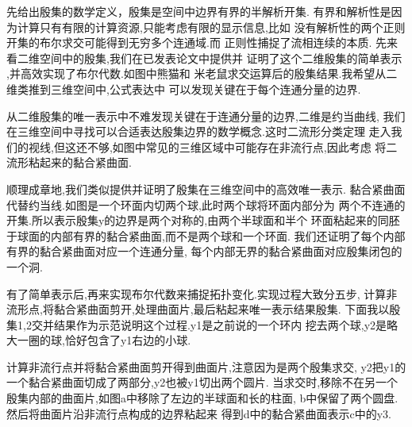 \documentclass[UTF8]{ctexbeamer}	%
\theoremstyle{plain}
\theoremstyle{definition}
\theoremstyle{remark}
\numberwithin{equation}{section}
\begin{document}
\begin{frame}
  先给出殷集的数学定义，殷集是空间中边界有界的半解析开集.
  有界和解析性是因为计算只有有限的计算资源,只能考虑有限的显示信息,比如
  没有解析性的两个正则开集的布尔求交可能得到无穷多个连通域.而
  正则性捕捉了流相连续的本质.
  先来看二维空间中的殷集,我们在已发表论文中提供并
  证明了这个二维殷集的简单表示
  ,并高效实现了布尔代数.如图中熊猫和
  米老鼠求交运算后的殷集结果.我希望从二维类推到三维空间中,公式表达中
  可以发现关键在于每个连通分量的边界.
\end{frame}

\begin{frame}
  从二维殷集的唯一表示中不难发现关键在于连通分量的边界,二维是约当曲线,
  我们在三维空间中寻找可以合适表达殷集边界的数学概念.这时二流形分类定理
  走入我们的视线,但这还不够,如图中常见的三维区域中可能存在非流行点,因此考虑
  将二流形粘起来的黏合紧曲面.
\end{frame}

\begin{frame}
  顺理成章地,我们类似提供并证明了殷集在三维空间中的高效唯一表示.
  黏合紧曲面代替约当线.如图是一个环面内切两个球,此时两个球将环面内部分为
  两个不连通的开集.所以表示殷集y的边界是两个对称的,由两个半球面和半个
  环面粘起来的同胚于球面的内部有界的黏合紧曲面,而不是两个球和一个环面.
  我们还证明了每个内部有界的黏合紧曲面对应一个连通分量,
  每个内部无界的黏合紧曲面对应殷集闭包的一个洞.
\end{frame}

\begin{frame}
  有了简单表示后,再来实现布尔代数来捕捉拓扑变化.实现过程大致分五步,
  计算非流形点,将黏合紧曲面剪开,处理曲面片,最后粘起来唯一表示结果殷集.
  下面我以殷集1,2交并结果作为示范说明这个过程.y1是之前说的一个环内
  挖去两个球,y2是略大一圈的球,恰好包含了y1右边的小球.
\end{frame}

\begin{frame}
  计算非流行点并将黏合紧曲面剪开得到曲面片,注意因为是两个殷集求交,
  y2把y1的一个黏合紧曲面切成了两部分,y2也被y1切出两个圆片.
  当求交时,移除不在另一个殷集内部的曲面片,如图a中移除了左边的半球面和长的柱面,
  b中保留了两个圆盘.然后将曲面片沿非流行点构成的边界粘起来
  得到d中的黏合紧曲面表示c中的y3.
\end{frame}
\end{document}
